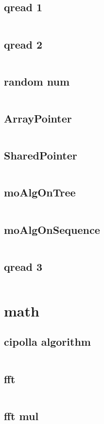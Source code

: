 \subsection{qread 1}
  \inputminted{cpp}{../code/utility/qread_1.cpp}
\subsection{qread 2}
  \inputminted{cpp}{../code/utility/qread_2.cpp}
\subsection{random num}
  \inputminted{cpp}{../code/utility/random_num.cpp}
\subsection{ArrayPointer}
  \inputminted{cpp}{../code/utility/ArrayPointer.cpp}
\subsection{SharedPointer}
  \inputminted{cpp}{../code/utility/SharedPointer.cpp}
\subsection{moAlgOnTree}
  \inputminted{cpp}{../code/utility/moAlgOnTree.cpp}
\subsection{moAlgOnSequence}
  \inputminted{cpp}{../code/utility/moAlgOnSequence.cpp}
\subsection{qread 3}
  \inputminted{cpp}{../code/utility/qread_3.cpp}
\section{math}
\subsection{cipolla algorithm}
  \inputminted{cpp}{../code/math/cipolla_algorithm.cpp}
\subsection{fft}
  \inputminted{cpp}{../code/math/fft.cpp}
\subsection{fft mul}
  \inputminted{cpp}{../code/math/fft_mul.cpp}
